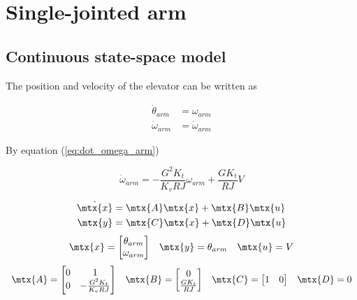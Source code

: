 \section{Single-jointed arm}

\subsection{Continuous state-space model}

The position and velocity of the elevator can be written as

\begin{align}
  \dot{\theta}_{arm} &= \omega_{arm} \label{eq:arm_cont_ss_pos} \\
  \dot{\omega}_{arm} &= \dot{\omega}_{arm} \label{eq:arm_cont_ss_vel}
\end{align}

By equation (\ref{eq:dot_omega_arm})

\begin{equation*}
  \dot{\omega}_{arm} = -\frac{G^2 K_t}{K_v RJ} \omega_{arm} + \frac{G K_t}{RJ} V
\end{equation*}

\begin{theorem}
  \begin{align*}
    \dot{\mtx{x}} &= \mtx{A} \mtx{x} + \mtx{B} \mtx{u} \\
    \mtx{y} &= \mtx{C} \mtx{x} + \mtx{D} \mtx{u}
  \end{align*}
  \begin{equation*}
    \begin{array}{ccc}
      \mtx{x} =
      \begin{bmatrix}
        \theta_{arm} \\
        \omega_{arm}
      \end{bmatrix} &
      \mtx{y} = \theta_{arm} &
      \mtx{u} = V
    \end{array}
  \end{equation*}
  \begin{equation}
    \begin{array}{cccc}
      \mtx{A} =
      \begin{bmatrix}
        0 & 1 \\
        0 & -\frac{G^2 K_t}{K_v RJ}
      \end{bmatrix} &
      \mtx{B} =
      \begin{bmatrix}
        0 \\
        \frac{G K_t}{RJ}
      \end{bmatrix} &
      \mtx{C} =
      \begin{bmatrix}
        1 & 0
      \end{bmatrix} &
      \mtx{D} = 0
    \end{array}
  \end{equation}
\end{theorem}

